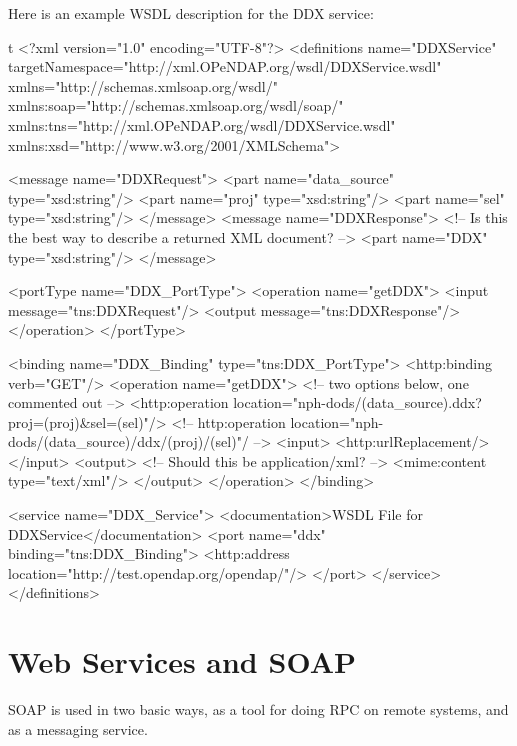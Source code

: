 \documentclass[justify]{dods-paper}
\begin{document}
Here is an example WSDL description for the DDX service:
\begin{vcode}{t}
<?xml version="1.0" encoding="UTF-8"?>
<definitions name="DDXService"
   targetNamespace="http://xml.OPeNDAP.org/wsdl/DDXService.wsdl"
   xmlns="http://schemas.xmlsoap.org/wsdl/"
   xmlns:soap="http://schemas.xmlsoap.org/wsdl/soap/"
   xmlns:tns="http://xml.OPeNDAP.org/wsdl/DDXService.wsdl"
   xmlns:xsd="http://www.w3.org/2001/XMLSchema">
 
   <message name="DDXRequest">
      <part name="data_source" type="xsd:string"/>
      <part name="proj" type="xsd:string"/>
      <part name="sel" type="xsd:string"/>
   </message>
   <message name="DDXResponse">
      <!-- Is this the best way to describe a returned XML document? -->
      <part name="DDX" type="xsd:string"/>
   </message>
 
   <portType name="DDX_PortType">
      <operation name="getDDX">
         <input message="tns:DDXRequest"/>
         <output message="tns:DDXResponse"/>
      </operation>
   </portType>

   <binding name="DDX_Binding" type="tns:DDX_PortType">
      <http:binding verb="GET"/>
       <operation name="getDDX">
           <!-- two options below, one commented out -->
           <http:operation location="nph-dods/(data_source).ddx?proj=(proj)&sel=(sel)"/>
           <!-- http:operation location="nph-dods/(data_source)/ddx/(proj)/(sel)"/ -->
           <input>
               <http:urlReplacement/>
           </input>
           <output>
               <!-- Should this be application/xml? -->
               <mime:content type="text/xml"/>
           </output>
       </operation>
   </binding>
 
   <service name="DDX_Service">
      <documentation>WSDL File for DDXService</documentation>
        <port name="ddx" binding="tns:DDX_Binding">
           <http:address location="http://test.opendap.org/opendap/"/>
        </port>
   </service>
</definitions>
\end{vcode}

\appendix

\section {Web Services and SOAP}
\label{ws+soap}

SOAP is used in two basic ways, as a tool for doing RPC on remote
systems, and as a messaging service.
\end{document}
